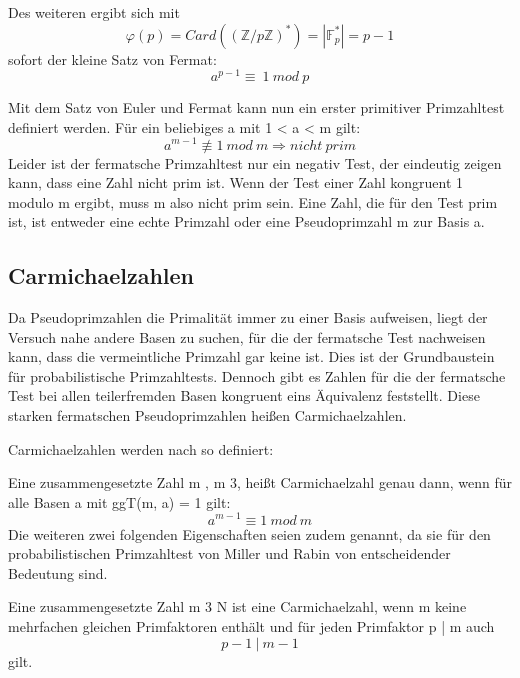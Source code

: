 	Des weiteren ergibt sich mit 
	\begin{displaymath}
		\varphi(p) = Card((\mathbb{Z}/p\mathbb{Z})^*) = |\mathbb{F}^*_p| = p-1
	\end{displaymath}
	sofort der kleine Satz von Fermat:
	\begin{displaymath}
		a^{p-1} \equiv~1~mod~p
	\end{displaymath}
		
	Mit dem Satz von Euler und Fermat kann nun ein erster primitiver Primzahltest definiert werden.  
	Für ein beliebiges 	a \myin {} mit 1 < a < m gilt:
	\begin{displaymath}
		a^{m-1} \not\equiv 1~mod~m \Longrightarrow nicht~prim
	\end{displaymath}
	Leider ist der fermatsche Primzahltest nur ein negativ Test, der eindeutig zeigen kann, dass eine Zahl nicht prim ist. Wenn der Test einer Zahl kongruent 1 modulo m ergibt, muss m also nicht prim sein. Eine Zahl, die für den Test prim ist, ist entweder eine echte Primzahl oder eine Pseudoprimzahl m zur Basis a.\cite{Elementare:Zahlentheorie}
		
	\subsection{Carmichaelzahlen}
	Da Pseudoprimzahlen die Primalität immer zu einer Basis aufweisen, liegt der Versuch nahe andere Basen zu suchen, für die der fermatsche Test nachweisen kann, dass die vermeintliche Primzahl gar keine ist. Dies ist der Grundbaustein für probabilistische Primzahltests. Dennoch gibt es Zahlen für die der fermatsche Test bei allen teilerfremden Basen kongruent eins Äquivalenz feststellt. Diese starken fermatschen Pseudoprimzahlen heißen Carmichaelzahlen.
	
	Carmichaelzahlen werden nach \cite{Algebraische:und:zahlentheoretische:Grundlagen:fuer:die:Informatik} so definiert:
	
	Eine zusammengesetzte Zahl m \myin {}, m \myMathRM{\geq} 3, heißt Carmichaelzahl genau dann, wenn für alle Basen a mit ggT(m, a) = 1 gilt: 
	\begin{displaymath}
		a^{m-1} \equiv 1~mod~m
	\end{displaymath}
	Die weiteren zwei folgenden Eigenschaften seien zudem genannt, da sie für den probabilistischen Primzahltest von Miller und Rabin von entscheidender Bedeutung sind.
	
	Eine zusammengesetzte Zahl m \myMathRM{\geq} 3 \myin N ist eine Carmichaelzahl, wenn m keine mehrfachen gleichen Primfaktoren enthält und für jeden Primfaktor p | m auch 
	\begin{displaymath}
		p-1~|~m-1
	\end{displaymath}
	gilt.	
	
